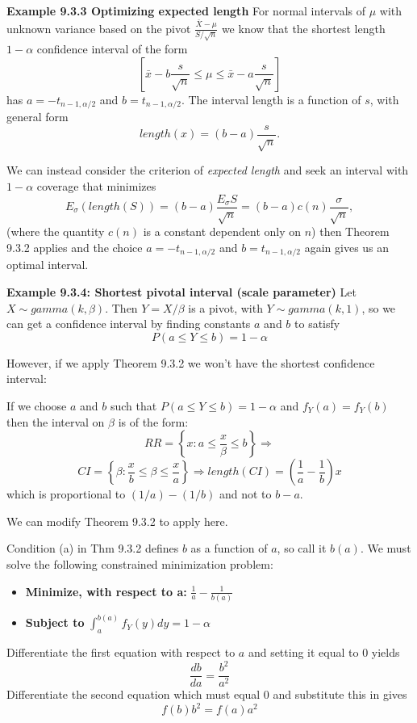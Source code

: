 \documentclass[11pt,]{article}
\providecommand{\tightlist}{%
  \setlength{\itemsep}{0pt}\setlength{\parskip}{0pt}}
\def\xbar{\bar{ x}}
\def\Xbar{\bar{ X}}
\begin{document}
\noindent\textbf{Example 9.3.3 Optimizing expected length} For normal
intervals of \(\mu\) with unknown variance based on the pivot
\(\frac{\Xbar - \mu}{S/\sqrt{n}}\) we know that the shortest length
\(1-\alpha\) confidence interval of the form
\[\left[\xbar - b\frac{s}{\sqrt{n} }\leq \mu \leq \xbar - a\frac{s}{\sqrt{n}}\right]\]
has \(a= -t_{n-1,\alpha/2}\) and \(b=t_{n-1,\alpha/2}.\) The interval
length is a function of \(s\), with general form
\[length(x) = (b-a)\frac{s}{\sqrt{n}}.\]

We can instead consider the criterion of \emph{expected length} and seek
an interval with \(1-\alpha\) coverage that minimizes
\[E_{\sigma}(length(S)) = (b-a)\frac{E_{\sigma} S}{\sqrt{n}} = (b-a) c(n) \frac{\sigma}{\sqrt{n}},\]
(where the quantity \(c(n)\) is a constant dependent only on \(n\)) then
Theorem 9.3.2 applies and the choice \(a = -t_{n-1,\alpha/2}\) and
\(b=t_{n-1,\alpha/2}\) again gives us an optimal interval.

\textbf{Example 9.3.4: Shortest pivotal interval (scale parameter)} Let
\(X \sim gamma(k,\beta)\). Then \(Y=X/\beta\) is a pivot, with
\(Y \sim gamma(k,1)\), so we can get a confidence interval by finding
constants \(a\) and \(b\) to satisfy \[P(a \leq Y \leq b) = 1-\alpha\]

However, if we apply Theorem 9.3.2 we won't have the shortest confidence
interval:

If we choose \(a\) and \(b\) such that \(P(a \leq Y \leq b) = 1-\alpha\)
and \(f_Y(a) = f_Y(b)\) then the interval on \(\beta\) is of the form:
\[RR = \left\{ x: a \leq \frac{x}{\beta} \leq b \right\} \Rightarrow\]
\[CI = \left\{ \beta: \frac{x}{b} \leq \beta \leq\frac{x}{a}\right\} \Rightarrow length(CI) =  \left(\frac{1}{a} - \frac{1}{b}\right) x\]
which is proportional to \((1/a) - (1/b)\) and not to \(b-a\).

We can modify Theorem 9.3.2 to apply here.

Condition (a) in Thm 9.3.2 defines \(b\) as a function of \(a\), so call
it \(b(a)\). We must solve the following constrained minimization
problem:

\begin{itemize}
\tightlist
\item
  \textbf{Minimize, with respect to a:} \(\frac{1}{a} - \frac{1}{b(a)}\)
\item
  \textbf{Subject to} \(\int_{a}^{b(a)} f_Y(y) dy = 1-\alpha\)
\end{itemize}

Differentiate the first equation with respect to \(a\) and setting it
equal to 0 yields \[\frac{db}{da} = \frac{b^2}{a^2}\] Differentiate the
second equation which must equal 0 and substitute this in gives
\[f(b)b^2 = f(a) a^2\]
\end{document}
